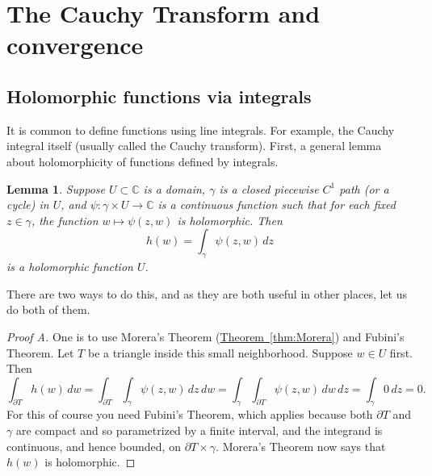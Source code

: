 \documentclass[12pt,openany]{book}
\newcommand{\C}{{\mathbb{C}}}
\theoremstyle{plain}
\newtheorem{lemma}[thm]{Lemma}
\theoremstyle{remark}
\theoremstyle{definition}
\theoremstyle{exercise}
\theoremstyle{example}
\newcommand{\thmref}[1]{\hyperref[#1]{Theorem~\ref*{#1}}}
\begin{document}
\section{The Cauchy Transform and convergence}

\subsection{Holomorphic functions via integrals}

It is common to define functions using line integrals.  For example,
the Cauchy integral itself (usually called the Cauchy transform).
First, a general lemma about holomorphicity of functions defined by integrals.

\begin{lemma} \label{lemma:holfuncbyintegral}
Suppose $U \subset \C$ is a domain, $\gamma$ is a closed
piecewise $C^1$ path (or a cycle) in $U$, and
$\psi \colon \gamma \times U \to \C$ is a continuous function such that
for each fixed $z \in \gamma$, the function $w \mapsto \psi(z,w)$ is
holomorphic.  Then
\begin{equation}
h(w) =
\int_\gamma \psi(z,w) \, dz
\end{equation}
is a holomorphic function $U$.
\end{lemma}

There are two ways to do this,
and as they are both useful in other places, let us do both of them.

\begin{proof}[Proof A]
One is to use Morera's Theorem (\thmref{thm:Morera}) and Fubini's Theorem.
Let $T$ be a triangle inside this small neighborhood.  Suppose $w \in U$
first.  Then
\begin{equation*}
\int_{\partial T}
h(w)
\, dw
=
\int_{\partial T}
\int_\gamma \psi(z,w) \, dz
\, dw
=
\int_\gamma
\int_{\partial T}
\psi(z,w)
\, dw
\, dz
= \int_\gamma 0 \, dz = 0.
\end{equation*}
For this of course you need Fubini's Theorem, which applies because both
$\partial T$ and $\gamma$ are compact and so parametrized by a finite
interval, and the integrand is continuous, and hence bounded,
on $\partial T \times \gamma$.
Morera's Theorem now says that $h(w)$ is
holomorphic.
\end{proof}
\end{document}
